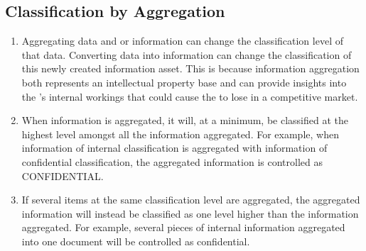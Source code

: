 \documentclass[../main.tex]{subfiles}
\begin{document}
\subsection{Classification by Aggregation}
\begin{enumerate}
    \item Aggregating data and or information can change the classification level of that data. Converting data into information can change the classification of
    this newly created information asset. This is because information aggregation both represents an intellectual property base and can provide insights into the \CompanyName’s internal
    workings that could cause the \CompanyName{} to lose in a competitive market.
    \item When information is aggregated, it will, at a minimum, be classified at the highest level amongst all the information aggregated. For example, when information of internal
    classification is aggregated with information of confidential classification, the aggregated information is controlled as CONFIDENTIAL.
    \item If several items at the same classification level are aggregated, the aggregated information will instead be classified as one level higher than the information aggregated.
    For example, several pieces of internal information aggregated into one document will be controlled as confidential.\cite{us}
\end{enumerate}
\end{document}
